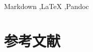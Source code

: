 \documentclass[final,3p,times,twocolumn,dvipdfmx]{elsarticle}
\begin{document}
\begin{frontmatter}


\begin{abstract}

\end{abstract}
\begin{keyword}
Markdown \sep LaTeX \sep Pandoc
\end{keyword}

\end{frontmatter}





\section{参考文献}



\end{document}
